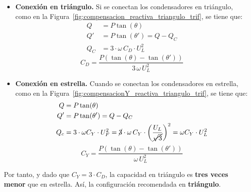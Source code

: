 \begin{itemize}
\item \textbf{Conexión en triángulo.} Si se conectan los condensadores
  en triángulo, como en la
  Figura~\ref{fig:compensacion_reactiva_triangulo_trif}, se tiene que:
  \begin{align*}
    Q &= P\tan(\theta)\\
    Q' &= P\tan(\theta') = Q - Q_C\\
    Q_C &= 3 \cdot \omega\, C_D \cdot U_L^2
  \end{align*}
  \begin{equation}
    \boxed{C_D = \frac{P(\tan (\theta) - \tan (\theta'))}{3\,\omega\, U_L^2}}
  \end{equation}
\item \textbf{Conexión en estrella.} Cuando se conectan los
  condensadores en estrella, como en la
  Figura~\ref{fig:compensacionY_reactiva_triangulo_trif}, se tiene
  que:
  \begin{align*}
    Q &= P\tan(\theta)\\
    Q' &= P\tan(\theta') = Q - Q_C\\
    Q_c &= 3 \cdot \omega C_Y \cdot U_F^2 = \cancel{3} \cdot \omega \,C_Y \cdot \left(\dfrac{U_L}{\cancel{\sqrt{3}}}\right)^2=\omega C_Y \cdot U_L^2
  \end{align*}
  \begin{equation}
    \boxed{C_Y = \frac{P(\tan (\theta) - \tan (\theta'))}{\omega\, U_L^2}}
  \end{equation}
\end{itemize}
		
		
		
Por tanto, y dado que $C_Y = 3 \cdot C_D$, la capacidad en triángulo
es \textbf{tres veces menor} que en estrella. Así, la configuración
recomendada en \textbf{triángulo}.
		
